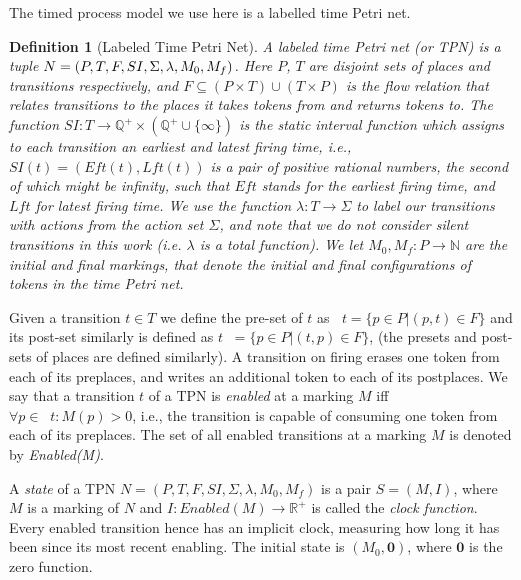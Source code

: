 \documentclass[conference]{IEEEtran}
\DeclareMathOperator*{\pre}{^\bullet}
\newtheorem{definition}{Definition}
\begin{document}
    The timed process model we use here is a labelled time Petri net. 
    
    \begin{definition}[Labeled Time Petri Net] \label{tpn} A labeled \textit{time Petri net} (or TPN) is a tuple $N = (P, T, F, SI, \Sigma, \lambda,\linebreak M_0, M_f)$.
Here $P$, $T$ are disjoint sets of places and transitions respectively,  and $F \subseteq (P \times T) \cup (T \times P)$ is the flow relation that relates transitions to the places it takes tokens from and returns tokens to. 
The function $SI : T \rightarrow \mathbb{Q}^+ \times (\mathbb{Q}^+ \cup \{\infty\})$ is the static interval function which assigns to each transition an earliest and latest firing time, i.e.,  $SI(t) = (Eft(t), Lft(t))$ is a pair of positive rational numbers, the second of which might be infinity, such that $Eft$ stands for the earliest firing time, and $Lft$ for latest firing time. We use the function $\lambda : T \rightarrow \Sigma$ to label our transitions with actions from the action set $\Sigma$, and note that we do not consider silent transitions in this work (i.e. $\lambda$ is a total function). We let $ M_0 , M_f: P \to \mathbb{N}$ are the initial and final markings, that denote the initial and final configurations of tokens in the time Petri net. %
    \end{definition}
    
    Given a transition $t \in T$ we define the pre-set of $t$ as $\pre t = \{p \in P | (p, t) \in F\}$ and its post-set similarly is defined as $t \pre = \{p \in P | (t, p) \in F\}$, (the presets and post-sets of places are defined similarly). A transition on firing erases one token from each of its preplaces, and writes an additional token to each of its postplaces. 
    We say that a transition $t$ of a TPN is \textit{enabled} at a marking $M$ iff $\forall p \in \pre t :  M(p) > 0$, i.e., the transition is capable of consuming one token from each of its preplaces. 
    The set of all enabled transitions at a marking $M$ is denoted by \textit{Enabled(M)}. 


    A \textit{state} of a TPN $N = (P, T, F, SI, \Sigma, \lambda, M_0, M_f)$ is a pair $S = (M, I)$, where $M$ is a marking of $N$ and $I : Enabled(M) \rightarrow \mathbb{R}^+$ is called the \textit{clock function}. Every enabled transition hence has an implicit clock, measuring how long it has been since its most recent enabling. The initial state is $(M_0, \mathbf{0})$, where $\mathbf{0} $ is the zero function. 
    
\end{document}
